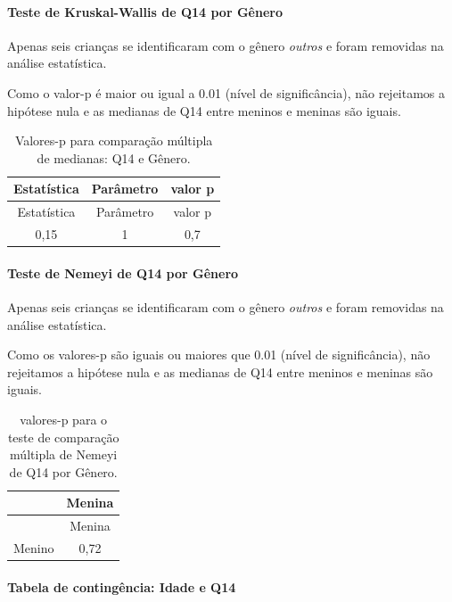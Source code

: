 \documentclass[]{article}
\let\oldparagraph\paragraph
\renewcommand{\paragraph}[1]{\oldparagraph{#1}\mbox{}}
\begin{document}
\hypertarget{teste-de-kruskal-wallis-de-q14-por-guxeanero}{%
\paragraph{Teste de Kruskal-Wallis de Q14 por Gênero}\label{teste-de-kruskal-wallis-de-q14-por-guxeanero}}

Apenas seis crianças se identificaram com o gênero \emph{outros} e foram removidas na análise estatística.

Como o valor-p é maior ou igual a 0.01 (nível de significância), não rejeitamos a hipótese nula e as medianas de Q14 entre meninos e meninas são iguais.

\begin{longtable}[]{@{}ccc@{}}
\caption{\label{tab:unnamed-chunk-29}Valores-p para comparação múltipla de medianas: Q14 e Gênero.}\tabularnewline
\toprule
Estatística & Parâmetro & valor p\tabularnewline
\midrule
\endfirsthead
\toprule
Estatística & Parâmetro & valor p\tabularnewline
\midrule
\endhead
0,15 & 1 & 0,7\tabularnewline
\bottomrule
\end{longtable}

\hypertarget{teste-de-nemeyi-de-q14-por-guxeanero}{%
\paragraph{Teste de Nemeyi de Q14 por Gênero}\label{teste-de-nemeyi-de-q14-por-guxeanero}}

Apenas seis crianças se identificaram com o gênero \emph{outros} e foram removidas na análise estatística.

Como os valores-p são iguais ou maiores que 0.01 (nível de significância), não rejeitamos a hipótese nula e as medianas de Q14 entre meninos e meninas são iguais.

\begin{longtable}[]{@{}lc@{}}
\caption{\label{tab:unnamed-chunk-31}valores-p para o teste de comparação múltipla de Nemeyi de Q14 por Gênero.}\tabularnewline
\toprule
& Menina\tabularnewline
\midrule
\endfirsthead
\toprule
& Menina\tabularnewline
\midrule
\endhead
Menino & 0,72\tabularnewline
\bottomrule
\end{longtable}

\cleardoublepage

\hypertarget{tabela-de-continguxeancia-idade-e-q14}{%
\paragraph{Tabela de contingência: Idade e Q14}\label{tabela-de-continguxeancia-idade-e-q14}}
\end{document}
